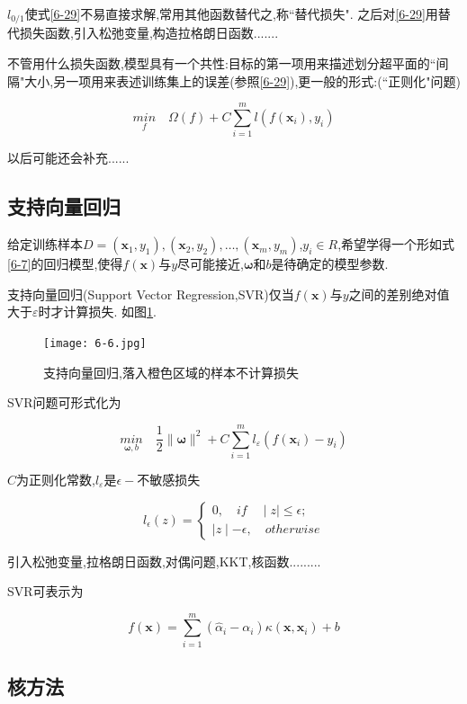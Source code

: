 \documentclass[12pt]{article}
\numberwithin{equation}{section}%
\begin{document}
$l_{0/1}$使式\ref{6-29}不易直接求解,常用其他函数替代之,称``替代损失". 之后对\ref{6-29}用替代损失函数,引入松弛变量,构造拉格朗日函数.......

不管用什么损失函数,模型具有一个共性:目标的第一项用来描述划分超平面的``间隔"大小,另一项用来表述训练集上的误差(参照\ref{6-29}),更一般的形式:(``正则化"问题)

\begin{equation}
{\underset{f}{min}} \quad \Omega(f)+C\sum_{i=1}^{m}l(f(\boldsymbol{x}_{i}),y_{i}) 
\end{equation}

以后可能还会补充......

\subsection{支持向量回归}

给定训练样本$D={(\boldsymbol{x}_{1},y_{1}),(\boldsymbol{x}_{2},y_{2}),\ldots,(\boldsymbol{x}_{m},y_{m})}$,$y_{i} \in R$,希望学得一个形如式\ref{6-7}的回归模型,使得$f(\boldsymbol{x})$与$y$尽可能接近,$\boldsymbol{\omega}$和$b$是待确定的模型参数.

支持向量回归(Support Vector Regression,SVR)仅当$f(\boldsymbol{x})$与$y$之间的差别绝对值大于$\varepsilon$时才计算损失. 如图\ref{6.6}.

\begin{figure}
\centering\texttt{[image: 6-6.jpg]}
\caption{支持向量回归,落入橙色区域的样本不计算损失}
\label{6.6}
\end{figure}

SVR问题可形式化为

\begin{equation}
{\underset{\boldsymbol{\omega},b}{min}} \quad \frac{1}{2}\parallel\boldsymbol{\omega}\parallel^{2}+C\sum_{i=1}^{m}l_{\varepsilon}(f(\boldsymbol{x}_{i})-y_{i})
\end{equation}

$C$为正则化常数,$l_{\varepsilon}$是$\epsilon-$不敏感损失

\begin{equation}
l_{\epsilon}(z)=
 \left\{ \begin{array}{ll}
0, \quad if  \quad \mid z\mid \leqslant \epsilon;\\
\mid z\mid - \epsilon,  \quad otherwise
\end{array} \right.
\end{equation}

引入松弛变量,拉格朗日函数,对偶问题,KKT,核函数.........

SVR可表示为

\begin{equation}
f(\boldsymbol{x})=\sum_{i=1}^{m}(\hat{\alpha}_{i}-\alpha_{i})\kappa(\boldsymbol{x},\boldsymbol{x}_{i})+b
\end{equation}

\subsection{核方法}




\end{document}
